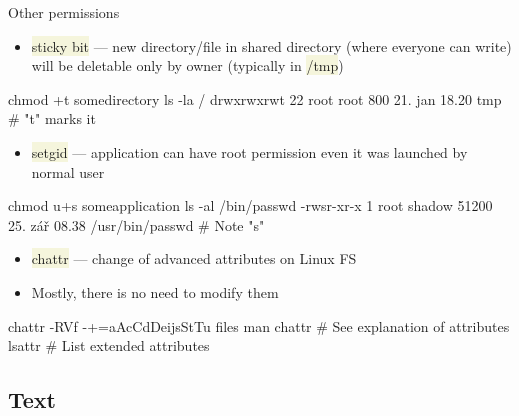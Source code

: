 \documentclass[compress, ucs, xelatex, 11pt, xcolor=svgnames, aspectratio=169,
	hyperref={
		bookmarks=true,
		unicode=true,
		colorlinks=true,
		pdftitle={Linux, command line and MetaCentrum},
		plainpages=false,
		pdfauthor={Vojtech Zeisek},
		pdfsubject={Course about use of Linux command line, writing shell scripts and using MetaCentrum of CESNET},
		pdfcreator={XeLaTeX},
		pdfkeywords={Linux, GNU, BASH, shell, command line, MetaCentrum},
		linkcolor=DarkRed, %
		anchorcolor=DarkBlue, %
		citecolor=Indigo, %
		filecolor=NavyBlue, %
		menucolor=DarkMagenta, %
		urlcolor=DarkBlue, %
		pdftex},
	url={hyphens, lowtilde} %
	]{beamer}
\renewcommand{\texttt}[1]{\colorbox{Beige}{{\ttfamily #1}}}
\begin{document}
\begin{frame}[fragile]{Other permissions}
	\begin{itemize}
		\item \texttt{sticky bit} --- new directory/file in shared directory (where everyone can write) will be deletable only by owner (typically in \texttt{/tmp})
	\end{itemize}
	\vfill
	\begin{bashcode}
    chmod +t somedirectory
    ls -la /
    drwxrwxrwt 22 root root 800 21. jan 18.20 tmp # "t" marks it
	\end{bashcode}
	\vfill
	\begin{itemize}
		\item \texttt{setgid} --- application can have root permission even it was launched by normal user
	\end{itemize}
	\vfill
	\begin{bashcode}
    chmod u+s someapplication
    ls -al /bin/passwd
    -rwsr-xr-x 1 root shadow 51200 25. zář 08.38 /usr/bin/passwd # Note "s"
	\end{bashcode}
	\vfill
	\begin{itemize}
		\item \texttt{chattr} --- change of advanced attributes on Linux FS
		\item Mostly, there is no need to modify them
	\end{itemize}
	\vfill
	\begin{bashcode}
    chattr -RVf -+=aAcCdDeijsStTu files
    man chattr # See explanation of attributes
    lsattr # List extended attributes
	\end{bashcode}
\end{frame}

\subsection{Text}
\end{document}
